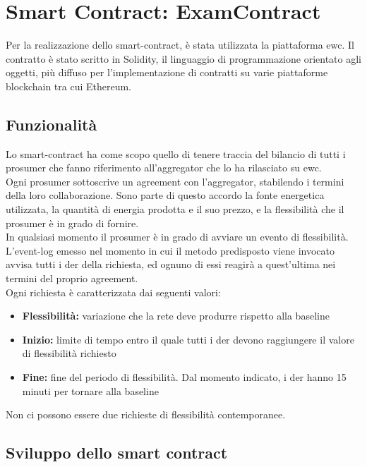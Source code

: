 \chapter{Smart Contract: ExamContract}

Per la realizzazione dello \gls{smart-contract}, è stata utilizzata la piattaforma \gls{ewc}.
Il contratto è stato scritto in Solidity, il linguaggio di programmazione orientato agli oggetti, più diffuso per l'implementazione di contratti su varie piattaforme blockchain tra cui Ethereum. \\

\section{Funzionalità}
Lo \gls{smart-contract} ha come scopo quello di tenere traccia del bilancio di tutti i \gls{prosumer} che fanno riferimento all'\gls{aggregator} che lo ha rilasciato su \gls{ewc}. \\
Ogni \gls{prosumer} sottoscrive un \gls{agreement} con l'\gls{aggregator}, stabilendo i termini della loro collaborazione.
Sono parte di questo accordo la fonte energetica utilizzata, la quantità di energia prodotta e il suo prezzo, e la flessibilità che il \gls{prosumer} è in grado di fornire. \\
In qualsiasi momento il \gls{prosumer} è in grado di avviare un evento di flessibilità.
L'\gls{event-log} emesso nel momento in cui il metodo predisposto viene invocato avvisa tutti i \gls{der} della richiesta,
ed ognuno di essi reagirà a quest'ultima nei termini del proprio \gls{agreement}. \\
Ogni richiesta è caratterizzata dai seguenti valori:
\begin{itemize}
  \item \textbf{Flessibilità:} variazione che la rete deve produrre rispetto alla \gls{baseline}
  \item \textbf{Inizio:} limite di tempo entro il quale tutti i \gls{der} devono raggiungere il valore di flessibilità richiesto
  \item \textbf{Fine:} fine del periodo di flessibilità. Dal momento indicato, i \gls{der} hanno 15 minuti per tornare alla baseline
\end{itemize}
Non ci possono essere due richieste di flessibilità contemporanee.

\section{Sviluppo dello smart contract}

